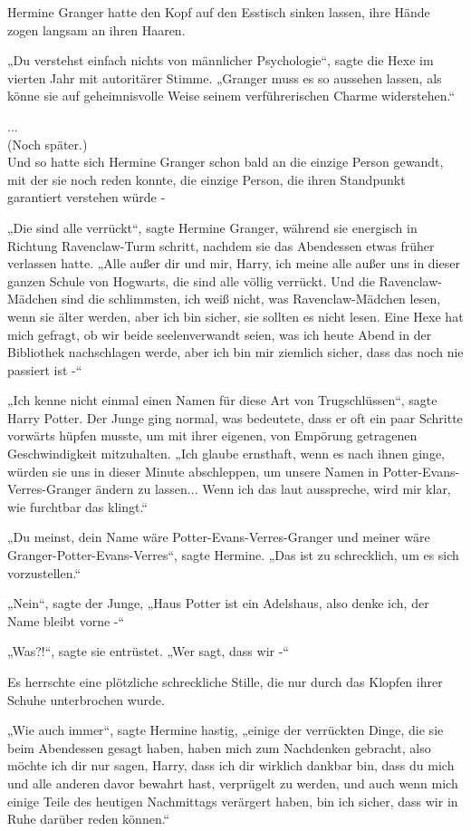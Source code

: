 {Hermine Granger hatte den Kopf auf den Esstisch sinken lassen, ihre Hände zogen langsam an ihren Haaren.

„Du verstehst einfach nichts von männlicher Psychologie“, sagte die Hexe im vierten Jahr mit autoritärer Stimme. „Granger muss es so aussehen lassen, als könne sie auf geheimnisvolle Weise seinem verführerischen Charme widerstehen.“

...\\ (Noch später.)\\ Und so hatte sich Hermine Granger schon bald an die einzige Person gewandt, mit der sie noch reden konnte, die einzige Person, die ihren Standpunkt garantiert verstehen würde -

„Die sind alle verrückt“, sagte Hermine Granger, während sie energisch in Richtung Ravenclaw-Turm schritt, nachdem sie das Abendessen etwas früher verlassen hatte. „Alle außer dir und mir, Harry, ich meine alle außer uns in dieser ganzen Schule von Hogwarts, die sind alle völlig verrückt. Und die Ravenclaw-Mädchen sind die schlimmsten, ich weiß nicht, was Ravenclaw-Mädchen lesen, wenn sie älter werden, aber ich bin sicher, sie sollten es nicht lesen. Eine Hexe hat mich gefragt, ob wir beide seelenverwandt seien, was ich heute Abend in der Bibliothek nachschlagen werde, aber ich bin mir ziemlich sicher, dass das noch nie passiert ist -“

„Ich kenne nicht einmal einen Namen für diese Art von Trugschlüssen“, sagte Harry Potter. Der Junge ging normal, was bedeutete, dass er oft ein paar Schritte vorwärts hüpfen musste, um mit ihrer eigenen, von Empörung getragenen Geschwindigkeit mitzuhalten. „Ich glaube ernsthaft, wenn es nach ihnen ginge, würden sie uns in dieser Minute abschleppen, um unsere Namen in Potter-Evans-Verres-Granger ändern zu lassen... Wenn ich das laut ausspreche, wird mir klar, wie furchtbar das klingt.“

„Du meinst, dein Name wäre Potter-Evans-Verres-Granger und meiner wäre Granger-Potter-Evans-Verres“, sagte Hermine. „Das ist zu schrecklich, um es sich vorzustellen.“

„Nein“, sagte der Junge, „Haus Potter ist ein Adelshaus, also denke ich, der Name bleibt vorne -“

„Was?!“, sagte sie entrüstet. „Wer sagt, dass wir -“

Es herrschte eine plötzliche schreckliche Stille, die nur durch das Klopfen ihrer Schuhe unterbrochen wurde.

„Wie auch immer“, sagte Hermine hastig, „einige der verrückten Dinge, die sie beim Abendessen gesagt haben, haben mich zum Nachdenken gebracht, also möchte ich dir nur sagen, Harry, dass ich dir wirklich dankbar bin, dass du mich und alle anderen davor bewahrt hast, verprügelt zu werden, und auch wenn mich einige Teile des heutigen Nachmittags verärgert haben, bin ich sicher, dass wir in Ruhe darüber reden können.“

}
